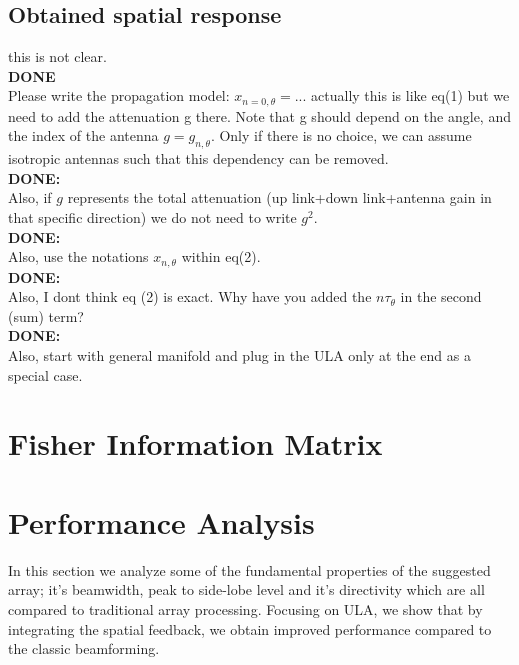 \subsection*{Obtained spatial response}
 {this is not clear. \\
\textbf{DONE}\\Please write the propagation model: $x_{n=0,\theta}=...$ actually this is like eq(1) but we need to add the attenuation g there. Note that g should depend on the angle, and the index of the antenna $g=g_{n,\theta}$. Only if there is no choice, we can assume isotropic antennas such that this dependency can be removed. 
\\\textbf{DONE:}\\Also, if $g$ represents the total attenuation (up link+down link+antenna gain in that specific direction) we do not need to write $g^2$. 
\\\textbf{DONE:}\\Also, use the notations $x_{n,\theta}$ within eq(2).
\\\textbf{DONE:}\\Also, I dont think eq (2) is exact. Why have you added the $n\tau_\theta$ in the second (sum) term? 
\\\textbf{DONE:}\\Also, start with general manifold and plug in the ULA only at the end as a special case.}

\section{Fisher Information Matrix}
\label{sec_FIM}

\section{Performance Analysis}
\label{sec_Performance}
In this section we analyze some of the fundamental properties of the suggested array; it's beamwidth, peak to side-lobe level and it's directivity which are all compared to traditional array processing. Focusing on ULA, we show that by integrating the spatial feedback, we obtain improved performance compared to the classic beamforming.

